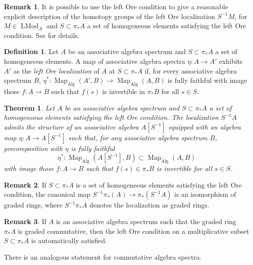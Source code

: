 \documentclass{article}
\newtheorem{theorem}{Theorem}[subsection]
\theoremstyle{definition}
\newtheorem{definition}{Definition}[subsection]
\newtheorem{remark}{Remark}[subsection]
\DeclareMathOperator{\LMod}{LMod}
\DeclareMathOperator{\Alg}{Alg}
\DeclareMathOperator{\Map}{Map}
\begin{document}
\begin{remark}
It is possible to use the left Ore condition to give a reasonable explicit description of the homotopy groups of the left Ore localization $S^{-1}M$, for $M\in\LMod_A$ and $S\subset\pi_* A$ a set of homogeneous elements satisfying the left Ore condition.
See \cite[Construction 7.2.3.19 and Proposition 7.2.3.20]{HA} for details.
\end{remark}

\begin{definition}
Let $A$ be an associative algebra spectrum and $S\subset\pi_* A$ a set of homogeneous elements.
A map of associative algebra spectra $\eta:A\to A'$ exhibits $A'$ as the {\em left Ore localization} of $A$ at $S\subset\pi_* A$ if, for every associative algebra spectrum $B$, $\eta^*:\Map_{\Alg}(A',B)\to\Map_{\Alg}(A,B)$ is fully faithful with image those $f:A\to B$ such that $f(s)$ is invertible in $\pi_* B$ for all $s\in S$.
\end{definition}

\begin{theorem}{\em \cite[Proposition 7.2.3.27]{HA}}
Let $A$ be an associative algebra spectrum and $S\subset\pi_* A$ a set of homogeneous elements satisfying the left Ore condition.
The localization $S^{-1} A$ admits the structure of an associative algebra $A[S^{-1}]$ equipped with an algebra map $\eta:A\to A[S^{-1}]$ such that, for any associative algebra spectrum $B$, precomposition with $\eta$ is fully faithful
\[
\eta^*:\Map_{\Alg}(A[S^{-1}],B)\subset\Map_{\Alg}(A,B)
\]
with image those $f:A\to B$ such that $f(s)\in\pi_* B$ is
invertible for all $s\in S$.
\end{theorem}

\begin{remark}
If $S\subset\pi_* A$ is a set of homogeneous elements satisfying the left Ore condition, the canonical map $S^{-1}\pi_*(A)\to\pi_*(S^{-1}A)$ is an isomorphism of graded rings, where $S^{-1}\pi_*A$ denotes the localization as graded rings.
\end{remark}

\begin{remark}
If $A$ is an associative algebra spectrum such that the graded ring $\pi_* A$ is graded commutative, then the left Ore condition on a multiplicative subset $S\subset\pi_* A$ is automatically satisfied.
\end{remark}

There is an analogous statement for commutative algebra spectra.
\end{document}

